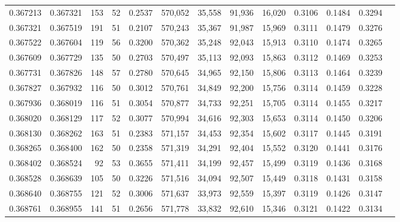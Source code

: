 \begin{tabular}{rrrrrrrrrrrrr}
0.367213 & 0.367321 &   153 &  52 &                                     0.2537 & 570,052 &  35,558 &  91,936 &  16,020 & 0.3106 & 0.1484 & 0.3294 \\
0.367321 & 0.367519 &   191 &  51 &                                     0.2107 & 570,243 &  35,367 &  91,987 &  15,969 & 0.3111 & 0.1479 & 0.3276 \\
0.367522 & 0.367604 &   119 &  56 &                                     0.3200 & 570,362 &  35,248 &  92,043 &  15,913 & 0.3110 & 0.1474 & 0.3265 \\
0.367609 & 0.367729 &   135 &  50 &                                     0.2703 & 570,497 &  35,113 &  92,093 &  15,863 & 0.3112 & 0.1469 & 0.3253 \\
0.367731 & 0.367826 &   148 &  57 &                                     0.2780 & 570,645 &  34,965 &  92,150 &  15,806 & 0.3113 & 0.1464 & 0.3239 \\
0.367827 & 0.367932 &   116 &  50 &                                     0.3012 & 570,761 &  34,849 &  92,200 &  15,756 & 0.3114 & 0.1459 & 0.3228 \\
0.367936 & 0.368019 &   116 &  51 &                                     0.3054 & 570,877 &  34,733 &  92,251 &  15,705 & 0.3114 & 0.1455 & 0.3217 \\
0.368020 & 0.368129 &   117 &  52 &                                     0.3077 & 570,994 &  34,616 &  92,303 &  15,653 & 0.3114 & 0.1450 & 0.3206 \\
0.368130 & 0.368262 &   163 &  51 &                                     0.2383 & 571,157 &  34,453 &  92,354 &  15,602 & 0.3117 & 0.1445 & 0.3191 \\
0.368265 & 0.368400 &   162 &  50 &                                     0.2358 & 571,319 &  34,291 &  92,404 &  15,552 & 0.3120 & 0.1441 & 0.3176 \\
0.368402 & 0.368524 &    92 &  53 &                                     0.3655 & 571,411 &  34,199 &  92,457 &  15,499 & 0.3119 & 0.1436 & 0.3168 \\
0.368528 & 0.368639 &   105 &  50 &                                     0.3226 & 571,516 &  34,094 &  92,507 &  15,449 & 0.3118 & 0.1431 & 0.3158 \\
0.368640 & 0.368755 &   121 &  52 &                                     0.3006 & 571,637 &  33,973 &  92,559 &  15,397 & 0.3119 & 0.1426 & 0.3147 \\
0.368761 & 0.368955 &   141 &  51 &                                     0.2656 & 571,778 &  33,832 &  92,610 &  15,346 & 0.3121 & 0.1422 & 0.3134 \\

\end{tabular}
